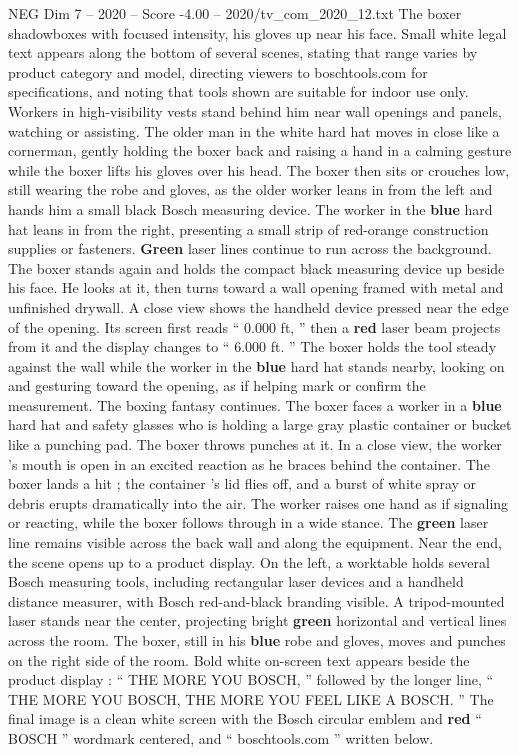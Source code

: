 \begin{textsample}{NEG Dim 7 – 2020 – Score -4.00 – 2020/tv\_com\_2020\_12.txt}
The boxer shadowboxes with focused intensity, his gloves up near his face.
Small white legal text appears along the bottom of several scenes, stating that range varies by product category and model, directing viewers to boschtools.com for specifications, and noting that tools shown are suitable for indoor use only.
Workers in high-visibility vests stand behind him near wall openings and panels, watching or assisting.
The older man in the white hard hat moves in close like a cornerman, gently holding the boxer back and raising a hand in a calming gesture while the boxer lifts his gloves over his head.
The boxer then sits or crouches low, still wearing the robe and gloves, as the older worker leans in from the left and hands him a small black Bosch measuring device.
The worker in the \textbf{blue} hard hat leans in from the right, presenting a small strip of red-orange construction supplies or fasteners. \textbf{Green} laser lines continue to run across the background.
The boxer stands again and holds the compact black measuring device up beside his face.
He looks at it, then turns toward a wall opening framed with metal and unfinished drywall.
A close view shows the handheld device pressed near the edge of the opening.
Its screen first reads “ 0.000 ft, ” then a \textbf{red} laser beam projects from it and the display changes to “ 6.000 ft. ” The boxer holds the tool steady against the wall while the worker in the \textbf{blue} hard hat stands nearby, looking on and gesturing toward the opening, as if helping mark or confirm the measurement.
The boxing fantasy continues.
The boxer faces a worker in a \textbf{blue} hard hat and safety glasses who is holding a large gray plastic container or bucket like a punching pad.
The boxer throws punches at it.
In a close view, the worker ’s mouth is open in an excited reaction as he braces behind the container.
The boxer lands a hit ; the container ’s lid flies off, and a burst of white spray or debris erupts dramatically into the air.
The worker raises one hand as if signaling or reacting, while the boxer follows through in a wide stance.
The \textbf{green} laser line remains visible across the back wall and along the equipment.
Near the end, the scene opens up to a product display.
On the left, a worktable holds several Bosch measuring tools, including rectangular laser devices and a handheld distance measurer, with Bosch red-and-black branding visible.
A tripod-mounted laser stands near the center, projecting bright \textbf{green} horizontal and vertical lines across the room.
The boxer, still in his \textbf{blue} robe and gloves, moves and punches on the right side of the room.
Bold white on-screen text appears beside the product display : “ THE MORE YOU BOSCH, ” followed by the longer line, “ THE MORE YOU BOSCH, THE MORE YOU FEEL LIKE A BOSCH. ” The final image is a clean white screen with the Bosch circular emblem and \textbf{red} “ BOSCH ” wordmark centered, and “ boschtools.com ” written below.

\end{textsample}

